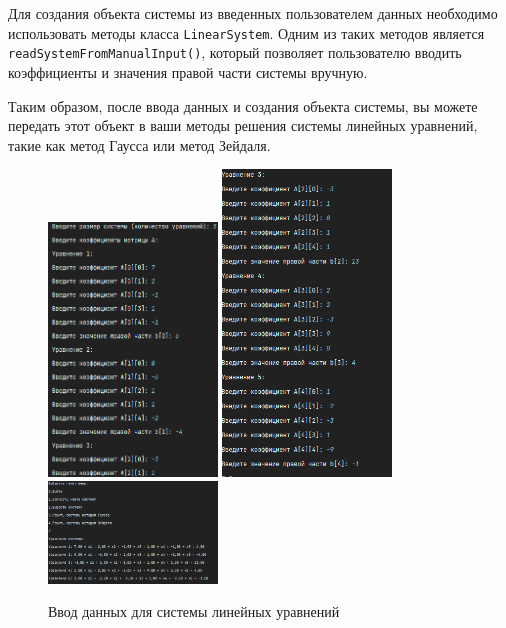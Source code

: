 \documentclass[12pt]{article}
\begin{document}
    Для создания объекта системы из введенных пользователем данных необходимо использовать методы класса \texttt{LinearSystem}. Одним из таких методов является \texttt{readSystemFromManualInput()}, который позволяет пользователю вводить коэффициенты и значения правой части системы вручную.

    Таким образом, после ввода данных и создания объекта системы, вы можете передать этот объект в ваши методы решения системы линейных уравнений, такие как метод Гаусса или метод Зейдаля.

    \clearpage

    \begin{figure}[ht]
        \centering
        {\includegraphics[width=0.4\textwidth]{image/system_input1}}
        \hfill
        {\includegraphics[width=0.4\textwidth]{image/system_input2}}
        \hfill
        {\includegraphics[width=0.4\textwidth]{image/system_input3}}
        \caption{Ввод данных для системы линейных уравнений}
    \end{figure}
\end{document}
